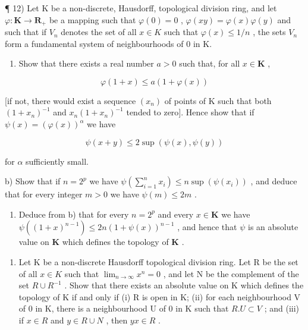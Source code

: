 ¶ 12) Let K be a non-discrete, Hausdorff, topological division ring, and let \(\varphi: \mathbf{K} \to \mathbf{R}_{+}\) be a mapping such that \(\varphi(0) = 0\) , \(\varphi(xy) = \varphi(x)\varphi(y)\) and such that if \(V_{n}\) denotes the set of all \(x \in K\) such that \(\varphi(x) \leqslant 1/n\) , the sets \(V_{n}\) form a fundamental system of neighbourhoods of \(0\) in K.

\begin{enumerate}
\def\labelenumi{\alph{enumi})}
\tightlist
\item
  Show that there exists a real number \(a > 0\) such that, for all \(x \in \mathbf{K}\) ,
\end{enumerate}

\[
\varphi (1 + x) \leqslant a (1 + \varphi (x))
\]

{[}if not, there would exist a sequence \((x_{n})\) of points of K such that both \((1 + x_n)^{-1}\) and \(x_{n}(1 + x_{n})^{-1}\) tended to zero{]}. Hence show that if \(\psi (x) = (\varphi (x))^{\alpha}\) we have

\[
\psi (x + y) \leqslant 2 \sup (\psi (x), \psi (y))
\]

for \(\alpha\) sufficiently small.

b) Show that if \(n = 2^p\) we have \(\psi\left(\sum_{i=1}^{n} x_i\right) \leqslant n \sup (\psi(x_i))\) , and deduce that for every integer \(m > 0\) we have \(\psi(m) \leqslant 2m\) .

\begin{enumerate}
\def\labelenumi{\alph{enumi})}
\setcounter{enumi}{2}
\tightlist
\item
  Deduce from b) that for every \(n = 2^p\) and every \(x \in \mathbf{K}\) we have \(\psi((1 + x)^{n-1}) \leqslant 2n(1 + \psi(x))^{n-1}\) , and hence that \(\psi\) is an absolute value on \(\mathbf{K}\) which defines the topology of \(\mathbf{K}\) .
\end{enumerate}

\begin{enumerate}
\def\labelenumi{\arabic{enumi})}
\setcounter{enumi}{12}
\tightlist
\item
  Let K be a non-discrete Hausdorff topological division ring. Let R be the set of all \(x \in K\) such that \(\lim_{n \to \infty} x^n = 0\) , and let N be the complement of the set \(R \cup R^{-1}\) . Show that there exists an absolute value on K which defines the topology of K if and only if (i) R is open in K; (ii) for each neighbourhood V of 0 in K, there is a neighbourhood U of 0 in K such that \(R.U \subset V\) ; and (iii) if \(x \in R\) and \(y \in R \cup N\) , then \(yx \in R\) .
\end{enumerate}

